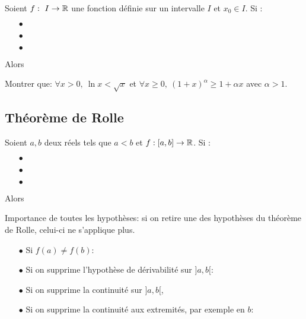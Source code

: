 \documentclass[a4paper, 11pt]{article}
\begin{document}
{\noindent

\begin{prop}
	Soient $f:\ I\rightarrow \mathbb{R}$ une fonction d\'efinie sur un intervalle $I$ et $x_0\in I$. Si : \vsec
	\begin{itemize}
		\item[$\bullet$] \dotfill \vsec
		\item[$\bullet$] \dotfill \vsec
		\item[$\bullet$] \dotfill \vsec
	\end{itemize}
	Alors \dotfill \vsec
\end{prop}
}

{\footnotesize
\begin{exercice}
	Montrer que: $\forall x>0,\ \ln{x}<\sqrt{x}$ et $\forall x\geq 0,\ (1+x)^{\alpha} \geq 1+\alpha x$ avec $\alpha>1$.
\end{exercice}}

\subsection{Th\'eor\`eme de Rolle}

{\noindent

	\begin{theorem}
		Soient $a,b$ deux r\'eels tels que $a<b$ et $f: \lbrack a,b\rbrack\rightarrow \mathbb{R}$. Si : \vsec
		\begin{itemize}
			\item[$\bullet$] \dotfill\vsec
			\item[$\bullet$] \dotfill\vsec
			\item[$\bullet$] \dotfill\vsec
		\end{itemize}
		Alors \dotfill \vsec
	\end{theorem}
}

\begin{rems}
	\noindent \warning  Importance de toutes les hypoth\`eses: si on retire une des hypoth\`eses du th\'eor\`eme de Rolle, celui-ci ne s'applique plus.
	\begin{itemize}
		\item[$\bullet$] Si $f(a)\not= f(b)$:
		      \vspace{2cm}

		\item[$\bullet$] Si on supprime l'hypoth\`ese de d\'erivabilit\'e sur $\rbrack a,b\lbrack$:
		      \vspace{2cm}

		\item[$\bullet$] Si on supprime la continuit\'e sur $\rbrack a,b\lbrack$,
		      \vspace{2cm}

		\item[$\bullet$] Si on supprime la continuit\'e aux extremit\'es, par exemple en $b$:
		      \vspace{2cm}

	\end{itemize}
\end{rems}
\end{document}
